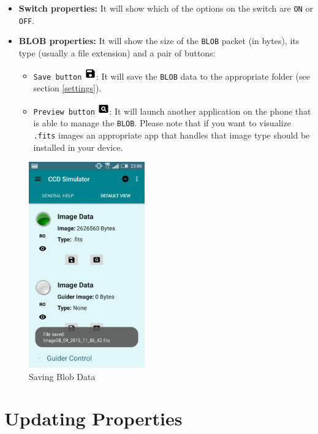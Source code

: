 \begin{itemize}
  \item \textbf{Switch properties:} It will show which of the options on the switch are \texttt{ON} or \texttt{OFF}.
  \item \textbf{BLOB properties:} It will show the size of the \texttt{BLOB} packet (in bytes), its type (usually a file extension) and a pair of buttons:
    \begin{itemize}
      \item \texttt{Save button} \includegraphics[width=0.5cm]{../images/saveBlobButton.png}: It will save the \texttt{BLOB} data to the appropriate folder (see section \ref{settings}). 
      \item \texttt{Preview button} \includegraphics[width=0.5cm]{../images/viewBlobButton.png}: It will launch another application on the phone that is able to manage the \texttt{BLOB}. Please note that if you want to visualize \texttt{.fits} images an appropriate app that handles that image type should be installed in your device.
    \end{itemize}
\end{itemize}

\begin{figure}
 \centering
 \includegraphics[width=5cm]{../images/saveBlob2.png}
 \caption{Saving Blob Data}
 \label{fig:saveBlob}
\end{figure}





\section{Updating Properties}

